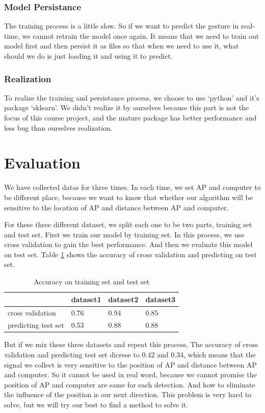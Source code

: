 \documentclass[conference]{IEEEtran}
\begin{document}
\subsubsection{Model Persistance}
The training process is a little slow. So if we want to predict the gesture in real-time, we cannot retrain the model once again. It means that we need to train out model first and then persist it as files so that when we need to use it, what should we do is just loading it and using it to predict.

\subsubsection{Realization}
To realize the training and persistance process, we choose to use `python' and it's package `sklearn'. We didn't realize it by ourselves because this part is not the focus of this course project, and the mature package has better performance and less bug than ourselves realization. 
\section{Evaluation} \label{section-evaluation}
We have collected datas for three times. In each time, we set AP and computer to be different place, because we want to know that whether our algorithm will be sensitive to the location of AP and distance between AP and computer.

For these three different dataset, we split each one to be two parts, training set and test set. First we train our model by training set. In this process, we use cross validation to gain the best performance. And then we evaluate this model on test set. Table \ref{result} shows the accuracy of cross validation and predicting on test set.

\begin{table}[]
\centering
\caption{Accuracy on training set and test set}
\label{result}
\begin{tabular}{|l|l|l|l|}
 \hline
 & dataset1 & dataset2 & dataset3 \\
 \hline
cross validation & 0.76 & 0.94 & 0.85 \\
\hline
predicting test set & 0.53 & 0.88 & 0.88 \\
 \hline
\end{tabular}
\end{table}

But if we mix these three datasets and repeat this process, The accuracy of cross validation and predicting test set dicrese to 0.42 and 0.34, which means that the signal we collect is very sensitive to the position of AP and distance between AP and computer. So it cannot be used in real word, because we cannot promise the position of AP and computer are same for each detection. And how to eliminate the influence of the position is our next direction. This problem is very hard to solve, but we will try our best to find a method to solve it.
\end{document}
